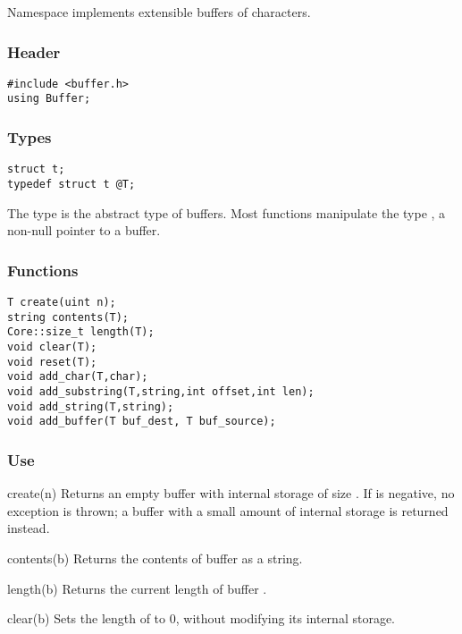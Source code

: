 Namespace  implements extensible buffers of characters.

\subsubsection*{Header}
\begin{verbatim}
#include <buffer.h>
using Buffer;
\end{verbatim}

\subsubsection*{Types}
\begin{verbatim}
struct t;
typedef struct t @T;
\end{verbatim}

The type  is the abstract type of buffers.  Most
functions manipulate the type , a non-null pointer to a buffer.

\subsubsection*{Functions}
\begin{verbatim}
T create(uint n);
string contents(T);
Core::size_t length(T);
void clear(T);
void reset(T);
void add_char(T,char);
void add_substring(T,string,int offset,int len);
void add_string(T,string);
void add_buffer(T buf_dest, T buf_source);
\end{verbatim}

\subsubsection*{Use}

\begin{defun}{create}{(n)}
Returns an empty buffer with internal storage of size .  If
 is negative, no exception is thrown; a buffer with a small
amount of internal storage is returned instead.
\end{defun}

\begin{defun}{contents}{(b)}
Returns the contents of buffer  as a string.
\end{defun}

\begin{defun}{length}{(b)}
Returns the current length of buffer .
\end{defun}

\begin{defun}{clear}{(b)}
Sets the length of  to 0, without modifying its internal storage.
\end{defun}


